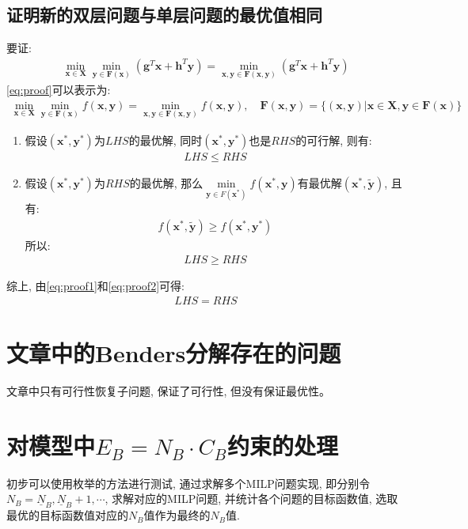 \documentclass{article}
\begin{document}
\subsection{证明新的双层问题与单层问题的最优值相同}
要证:
\begin{align}
    \min\limits_{\boldsymbol{x}\in\boldsymbol{X}}\min\limits_{\boldsymbol{y}\in\boldsymbol{F(x)}} (\boldsymbol{g}^T\boldsymbol{x}+ \boldsymbol{h}^T\boldsymbol{y})=\min\limits_{\boldsymbol{x,y}\in\boldsymbol{F(x,y)}}(\boldsymbol{g}^T\boldsymbol{x}+\boldsymbol{h}^T\boldsymbol{y}) \label{eq:proof}
\end{align}
\eqref{eq:proof}可以表示为:
\begin{align}
    \min\limits_{\boldsymbol{x}\in\boldsymbol{X}}\min\limits_{\boldsymbol{y}\in\boldsymbol{F(x)}} f(\boldsymbol{x,y})=\min\limits_{\boldsymbol{x,y}\in\boldsymbol{F(x,y)}} f(\boldsymbol{x,y}), \quad \boldsymbol{F(x,y)}=\{(\boldsymbol{x,y})|\boldsymbol{x}\in\boldsymbol{X},\boldsymbol{y}\in\boldsymbol{F(x)}\}
\end{align}
\begin{enumerate}
    \item 假设$(\boldsymbol{x^*,y^*})$为$LHS$的最优解, 同时$(\boldsymbol{x^*,y^*})$也是$RHS$的可行解, 则有:
    \begin{align}
        LHS\leq RHS \label{eq:proof1}
    \end{align}
    \item 假设$(\boldsymbol{x^*,y^*})$为$RHS$的最优解, 那么$\min\limits_{\boldsymbol{y}\in F(\boldsymbol{x^*})}f(\boldsymbol{x^*,y})$有最优解$(\boldsymbol{x^*,\widetilde{y}})$, 且有:
    \begin{align}
        f(\boldsymbol{x^*,\widetilde{y}})\geq f(\boldsymbol{x^*,y^*})
    \end{align}
    所以:
    \begin{align}
        LHS\geq RHS \label{eq:proof2}
    \end{align}
\end{enumerate}
综上, 由\eqref{eq:proof1}和\eqref{eq:proof2}可得:
\begin{align}
    LHS=RHS
\end{align}

\section{文章中的Benders分解存在的问题}
文章中只有可行性恢复子问题, 保证了可行性, 但没有保证最优性。

\section{对模型中\texorpdfstring{$E_B=N_B\cdot C_B$}.约束的处理}
初步可以使用枚举的方法进行测试, 通过求解多个MILP问题实现, 即分别令$N_B=\underline{N}_B,\underline{N}_B+1,\cdots$, 求解对应的MILP问题, 并统计各个问题的目标函数值, 选取最优的目标函数值对应的$N_B$值作为最终的$N_B$值.
\end{document}
